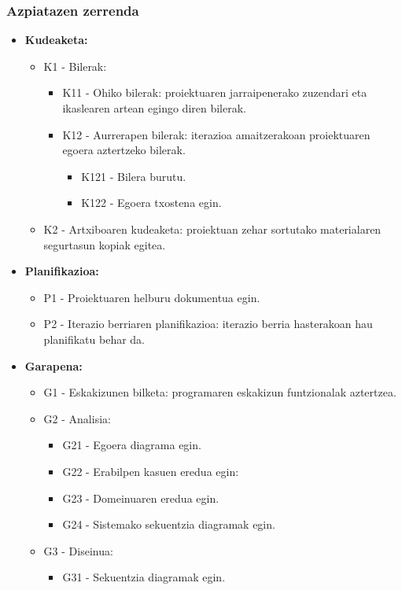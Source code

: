 \subsubsection{Azpiatazen zerrenda}
\begin{itemize}
\item \textbf{Kudeaketa:}
	\begin{itemize}
	\item K1 - Bilerak:
		\begin{itemize}
		\item K11 - Ohiko bilerak: proiektuaren jarraipenerako zuzendari eta ikaslearen artean egingo diren bilerak.
		\item K12 - Aurrerapen bilerak: iterazioa amaitzerakoan proiektuaren egoera aztertzeko bilerak.
			\begin{itemize}
			\item K121 - Bilera burutu.
			\item K122 - Egoera txostena egin.
			\end{itemize} 
		\end{itemize}
	\item K2 - Artxiboaren kudeaketa: proiektuan zehar sortutako materialaren segurtasun kopiak egitea.
	\end{itemize}
\item \textbf{Planifikazioa:}
	\begin{itemize}
	\item P1 - Proiektuaren helburu dokumentua egin.
	\item P2 - Iterazio berriaren planifikazioa: iterazio berria hasterakoan hau planifikatu behar da.
	\end{itemize}
\item \textbf{Garapena:}
	\begin{itemize}
	\item G1 - Eskakizunen bilketa: programaren eskakizun funtzionalak aztertzea.
	\item G2 - Analisia:
		\begin{itemize}
		\item G21 - Egoera diagrama egin.
		\item G22 - Erabilpen kasuen eredua egin: 
		\item G23 - Domeinuaren eredua egin.
		\item G24 - Sistemako sekuentzia diagramak egin.
		\end{itemize}
	\item G3 - Diseinua:
		\begin{itemize}
		\item G31 - Sekuentzia diagramak egin.

\end{itemize}
\end{itemize}
\end{itemize}

